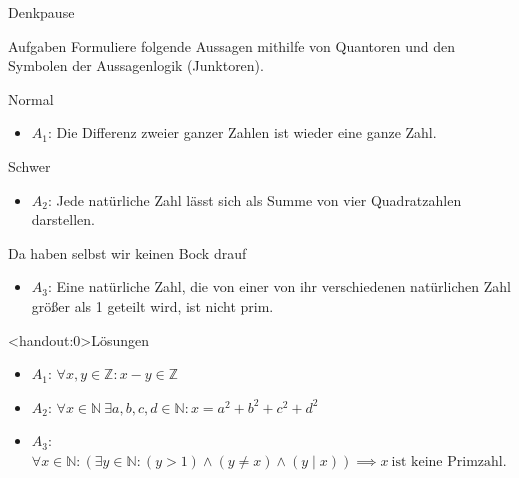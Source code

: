 {
\begin{frame}{Denkpause}
    \begin{alertblock}{Aufgaben}
        Formuliere folgende Aussagen mithilfe von Quantoren und den Symbolen der Aussagenlogik (Junktoren).
    \end{alertblock}
    \begin{block}{Normal}
        \begin{itemize}
            \item $A_1$: Die Differenz zweier ganzer Zahlen ist wieder eine ganze Zahl.
        \end{itemize}
    \end{block}
    \begin{block}{Schwer}
        \begin{itemize}
            \item $A_2$: Jede natürliche Zahl lässt sich als Summe von vier Quadratzahlen darstellen.
        \end{itemize}
    \end{block}
    \begin{block}{Da haben selbst wir keinen Bock drauf}
        \begin{itemize}
            \item $A_3$: Eine natürliche Zahl, die von einer von ihr verschiedenen natürlichen Zahl größer als 1 geteilt wird, ist nicht prim.
        \end{itemize}
    \end{block}
\end{frame}
}

{
\begin{frame}<handout:0>{Lösungen}
    \begin{itemize}[<+- | alert@+>]
        \item
              $A_1$: $\forall x,y \in \mathbb{Z}: x-y \in \mathbb{Z}$
        \item
              $A_2$: $\forall x \in \mathbb{N}\ \exists a, b, c, d \in \mathbb{N}: x = a^2 + b^2 + c^2 + d^2$
        \item
              $A_3$: $\forall x \in \mathbb{N}: \left(\exists y \in \mathbb{N}: (y>1) \wedge (y \neq x) \wedge (y \mid x)\right) \implies x\ \text{ist keine Primzahl}$.
    \end{itemize}
\end{frame}
}

